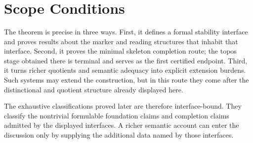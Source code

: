 \documentclass[11pt]{article}
\begin{document}
\begin{code}
\<%
\\
%
\>[2]\AgdaSymbol{;}\AgdaSpace{}%
\AgdaSpace{}%
\AgdaSymbol{=}\AgdaSpace{}%
\<%
\\
%
\>[2]\AgdaSymbol{;}\AgdaSpace{}%
%
\>[29]\AgdaSymbol{=}\AgdaSpace{}%
\<%
\\
%
\>[2]\AgdaSymbol{;}\AgdaSpace{}%
%
\>[29]\AgdaSymbol{=}\AgdaSpace{}%
\<%
\\
%
\>[2]\AgdaSymbol{;}\AgdaSpace{}%
%
\>[29]\AgdaSymbol{=}\AgdaSpace{}%
\<%
\\
%
\>[2]\AgdaSymbol{\}}\<%
\end{code}

\section{Scope Conditions}

The theorem is precise in three ways.  First, it defines a formal
stability interface and proves results about the marker and reading
structures that inhabit that interface.  Second, it proves the minimal
skeleton completion route; the topos stage obtained there is terminal and
serves as the first certified endpoint.  Third, it turns richer
quotients and semantic adequacy into explicit extension burdens.  Such
systems may extend the construction, but in this route they come after
the distinctional and quotient structure already displayed here.

The exhaustive classifications proved later are therefore
interface-bound.  They classify the nontrivial formulable foundation
claims and completion claims admitted by the displayed interfaces.  A
richer semantic account can enter the discussion only by supplying the
additional data named by those interfaces.
\end{document}
